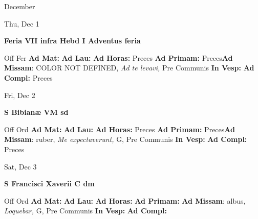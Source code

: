 \documentclass[10pt]{memoir}
\begin{document}
\begin{center}
\pagebreak
\thispagestyle{empty}
{\Huge December}
\end{center}
                    
\begin{center}
\begin{minipage}{3.5in}
\vspace{2em}
\begin{center}Thu, Dec 1
\end{center}
\textbf{ \large Feria VII infra Hebd I Adventus
\textnormal{\normalsize feria}}

\begin{justify}Off Fer
\textbf{Ad Mat: }
\textbf{Ad Lau: }
\textbf{Ad Horas: }Preces
\textbf{Ad Primam: }Preces\textbf{Ad Missam}: COLOR NOT DEFINED, \textit{Ad te levavi,} Pre Communis
\textbf{In Vesp: }
\textbf{Ad Compl: }Preces
\end{justify}
\end{minipage}
\end{center}

\begin{center}
\begin{minipage}{3.5in}
\vspace{2em}
\begin{center}Fri, Dec 2
\end{center}
\textbf{ \large S Bibianæ VM
\textnormal{\normalsize sd}}

\begin{justify}Off Ord
\textbf{Ad Mat: }
\textbf{Ad Lau: }
\textbf{Ad Horas: }Preces
\textbf{Ad Primam: }Preces\textbf{Ad Missam}: ruber, \textit{Me expectaverunt,} G, Pre Communis
\textbf{In Vesp: }
\textbf{Ad Compl: }Preces
\end{justify}
\end{minipage}
\end{center}

\begin{center}
\begin{minipage}{3.5in}
\vspace{2em}
\begin{center}Sat, Dec 3
\end{center}
\textbf{ \large S Francisci Xaverii C
\textnormal{\normalsize dm}}

\begin{justify}Off Ord
\textbf{Ad Mat: }
\textbf{Ad Lau: }
\textbf{Ad Horas: }
\textbf{Ad Primam: }\textbf{Ad Missam}: albus, \textit{Loquebar,} G, Pre Communis
\textbf{In Vesp: }
\textbf{Ad Compl: }
\end{justify}
\end{minipage}
\end{center}
\end{document}
